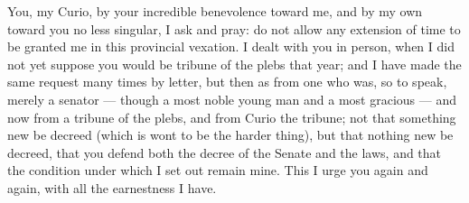  You, my Curio, by your incredible benevolence toward me, and by my own toward you no less singular, I ask and pray: do not allow any extension of time to be granted me in this provincial vexation. I dealt with you in person, when I did not yet suppose you would be tribune of the plebs that year; and I have made the same request many times by letter, but then as from one who was, so to speak, merely a senator --- though a most noble young man and a most gracious --- and now from a tribune of the plebs, and from Curio the tribune; not that something new be decreed (which is wont to be the harder thing), but that nothing new be decreed, that you defend both the decree of the Senate and the laws, and that the condition under which I set out remain mine. This I urge you again and again, with all the earnestness I have.
